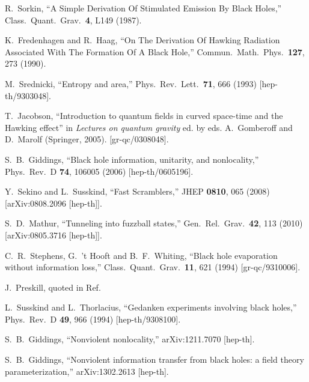 \documentclass[12pt]{article}
\begin{document}
\begin{thebibliography}{99}
  R.~Sorkin,
  ``A Simple Derivation Of Stimulated Emission By Black Holes,''
  Class.\ Quant.\ Grav.\  {\bf 4}, L149 (1987).


  K.~Fredenhagen and R.~Haag,
  ``On The Derivation Of Hawking Radiation Associated With The Formation Of A Black Hole,''
  Commun.\ Math.\ Phys.\  {\bf 127}, 273 (1990).

  M.~Srednicki,
  ``Entropy and area,''
  Phys.\ Rev.\ Lett.\  {\bf 71}, 666 (1993)
  [hep-th/9303048].

  T.~Jacobson,
  ``Introduction to quantum fields in curved space-time and the Hawking effect'' in
  {\it Lectures on quantum gravity} ed. by eds. A.~Gomberoff and D.~Marolf (Springer, 2005).
  [gr-qc/0308048].

  S.~B.~Giddings,
  ``Black hole information, unitarity, and nonlocality,''
  Phys.\ Rev.\ D {\bf 74}, 106005 (2006)
  [hep-th/0605196].


  Y.~Sekino and L.~Susskind,
  ``Fast Scramblers,''
  JHEP {\bf 0810}, 065 (2008)
  [arXiv:0808.2096 [hep-th]].

  S.~D.~Mathur,
  ``Tunneling into fuzzball states,''
  Gen.\ Rel.\ Grav.\  {\bf 42}, 113 (2010)
  [arXiv:0805.3716 [hep-th]].

  C.~R.~Stephens, G.~'t Hooft and B.~F.~Whiting,
  ``Black hole evaporation without information loss,''
  Class.\ Quant.\ Grav.\  {\bf 11}, 621 (1994)
  [gr-qc/9310006].

J.~Preskill, quoted in Ref.~\cite{Susskind:1993if}

  L.~Susskind and L.~Thorlacius,
  ``Gedanken experiments involving black holes,''
  Phys.\ Rev.\ D {\bf 49}, 966 (1994)
  [hep-th/9308100].


  S.~B.~Giddings,
  ``Nonviolent nonlocality,''
  arXiv:1211.7070 [hep-th].

  S.~B.~Giddings,
  ``Nonviolent information transfer from black holes: a field theory parameterization,''
  arXiv:1302.2613 [hep-th].


\end{thebibliography}
\end{document}
